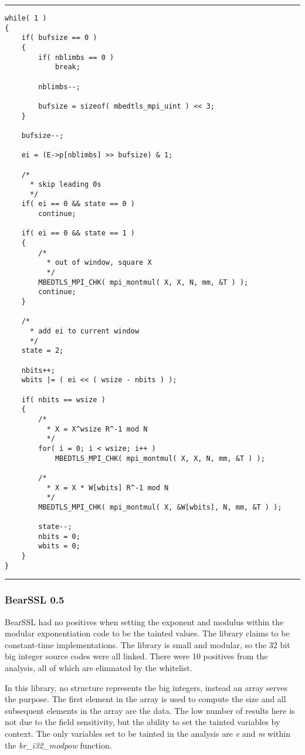 \documentclass[11pt,a4paper]{article}
\newcommand{\codevar}[1]{\textit{#1}}
\newcommand{\codefn}[1]{\textit{#1}}
\newcommand{\ruleabove}{\vspace{5pt}\hrule}
\newcommand{\rulebelow}{\hrule\vspace{5pt}}
\begin{document}
\ruleabove
\begin{lstlisting}[caption=mbed TLS 2.9.0 - bignum.c lines 1717-1773]
while( 1 )
{
    if( bufsize == 0 )
    {
        if( nblimbs == 0 )
            break;

        nblimbs--;

        bufsize = sizeof( mbedtls_mpi_uint ) << 3;
    }

    bufsize--;

    ei = (E->p[nblimbs] >> bufsize) & 1;

    /*
      * skip leading 0s
      */
    if( ei == 0 && state == 0 )
        continue;

    if( ei == 0 && state == 1 )
    {
        /*
          * out of window, square X
          */
        MBEDTLS_MPI_CHK( mpi_montmul( X, X, N, mm, &T ) );
        continue;
    }

    /*
      * add ei to current window
      */
    state = 2;

    nbits++;
    wbits |= ( ei << ( wsize - nbits ) );

    if( nbits == wsize )
    {
        /*
          * X = X^wsize R^-1 mod N
          */
        for( i = 0; i < wsize; i++ )
            MBEDTLS_MPI_CHK( mpi_montmul( X, X, N, mm, &T ) );

        /*
          * X = X * W[wbits] R^-1 mod N
          */
        MBEDTLS_MPI_CHK( mpi_montmul( X, &W[wbits], N, mm, &T ) );

        state--;
        nbits = 0;
        wbits = 0;
    }
}
\end{lstlisting}
\rulebelow

\subsubsection{BearSSL 0.5}
  BearSSL had no positives when setting the exponent and modulus within the
  modular exponentiation code to be the tainted values. The library claims to be
  constant-time implementations. The library is small and modular, so the
  32 bit big integer source codes were all linked. There were 10 positives from
  the analysis, all of which are elimnated by the whitelist.
  
  In this library, no structure represents the big integers, instead an array
  serves the purpose. The first element in the array is used to compute the size
  and all subsequent elements in the array are the data. The low number of
  results here is not due to the field sensitivity, but the ability to set the
  tainted variables by context. The only variables set to be tainted in the
  analysis are \codevar{e} and \codevar{m} within the \codefn{br\_i32\_modpow} function.
\end{document}
